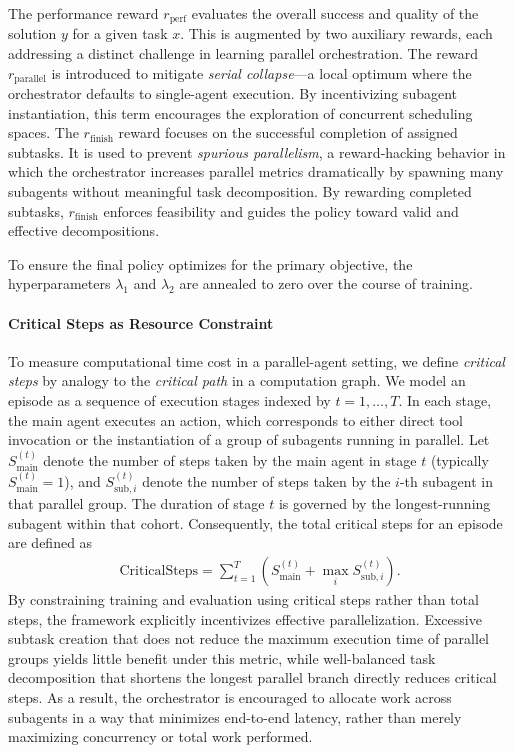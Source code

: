 \documentclass{article}
\begin{document}
The performance reward $r_{\text{perf}}$ evaluates the overall success and quality of the solution $y$ for a given task $x$. This is augmented by two auxiliary rewards, each addressing a distinct challenge in learning parallel orchestration. The reward $r_{\text{parallel}}$ is introduced to mitigate \emph{serial collapse}—a local optimum where the orchestrator defaults to single-agent execution. By incentivizing subagent instantiation, this term encourages the exploration of concurrent scheduling spaces. The $r_{\text{finish}}$ reward focuses on the successful completion of assigned subtasks. It is used to prevent \emph{spurious parallelism}, a reward-hacking behavior in which the orchestrator increases parallel metrics dramatically by spawning many subagents without meaningful task decomposition. By rewarding completed subtasks, $r_{\text{finish}}$ enforces feasibility and guides the policy toward valid and effective decompositions.

To ensure the final policy optimizes for the primary objective, the hyperparameters $\lambda_1$ and $\lambda_2$ are annealed to zero over the course of training.

\paragraph{Critical Steps as Resource Constraint} 
To measure computational time cost in a parallel-agent setting, we define \emph{critical steps} by analogy to the \emph{critical path} in a computation graph. 
We model an episode as a sequence of execution stages indexed by $t = 1, \dots, T$. 
In each stage, the main agent executes an action, which corresponds to either direct tool invocation or the instantiation of a group of subagents running in parallel. Let $S_{\mathrm{main}}^{(t)}$ denote the number of steps taken by the main agent in stage $t$ (typically $S_{\mathrm{main}}^{(t)} = 1$), and  $S_{\mathrm{sub},i}^{(t)}$ denote the number of steps taken by the $i$-th subagent in that parallel group. 
The duration of stage $t$ is governed by the longest-running subagent within that cohort. Consequently, the total critical steps for an episode are defined as 
\begin{align*}
\text{CriticalSteps}
= \sum_{t=1}^{T} \left( S_{\mathrm{main}}^{(t)} + \max_i S_{\mathrm{sub}, i}^{(t)} \right).
\end{align*}
By constraining training and evaluation using critical steps rather than total steps, the framework explicitly incentivizes effective parallelization. Excessive subtask creation that does not reduce the maximum execution time of parallel groups yields little benefit under this metric, while well-balanced task decomposition that shortens the longest parallel branch directly reduces critical steps. As a result, the orchestrator is encouraged to allocate work across subagents in a way that minimizes end-to-end latency, rather than merely maximizing concurrency or total work performed.
\end{document}
